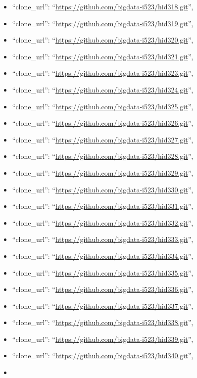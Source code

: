 \begin{itemize}
\item
  ``clone\_url'': ``\url{https://github.com/bigdata-i523/hid318.git}'',
\item
  ``clone\_url'': ``\url{https://github.com/bigdata-i523/hid319.git}'',
\item
  ``clone\_url'': ``\url{https://github.com/bigdata-i523/hid320.git}'',
\item
  ``clone\_url'': ``\url{https://github.com/bigdata-i523/hid321.git}'',
\item
  ``clone\_url'': ``\url{https://github.com/bigdata-i523/hid323.git}'',
\item
  ``clone\_url'': ``\url{https://github.com/bigdata-i523/hid324.git}'',
\item
  ``clone\_url'': ``\url{https://github.com/bigdata-i523/hid325.git}'',
\item
  ``clone\_url'': ``\url{https://github.com/bigdata-i523/hid326.git}'',
\item
  ``clone\_url'': ``\url{https://github.com/bigdata-i523/hid327.git}'',
\item
  ``clone\_url'': ``\url{https://github.com/bigdata-i523/hid328.git}'',
\item
  ``clone\_url'': ``\url{https://github.com/bigdata-i523/hid329.git}'',
\item
  ``clone\_url'': ``\url{https://github.com/bigdata-i523/hid330.git}'',
\item
  ``clone\_url'': ``\url{https://github.com/bigdata-i523/hid331.git}'',
\item
  ``clone\_url'': ``\url{https://github.com/bigdata-i523/hid332.git}'',
\item
  ``clone\_url'': ``\url{https://github.com/bigdata-i523/hid333.git}'',
\item
  ``clone\_url'': ``\url{https://github.com/bigdata-i523/hid334.git}'',
\item
  ``clone\_url'': ``\url{https://github.com/bigdata-i523/hid335.git}'',
\item
  ``clone\_url'': ``\url{https://github.com/bigdata-i523/hid336.git}'',
\item
  ``clone\_url'': ``\url{https://github.com/bigdata-i523/hid337.git}'',
\item
  ``clone\_url'': ``\url{https://github.com/bigdata-i523/hid338.git}'',
\item
  ``clone\_url'': ``\url{https://github.com/bigdata-i523/hid339.git}'',
\item
  ``clone\_url'': ``\url{https://github.com/bigdata-i523/hid340.git}'',
\item

\end{itemize}
